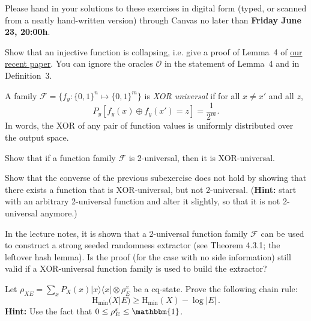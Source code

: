 \documentclass[a4paper,10pt,landscape,twocolumn]{scrartcl}
\newcommand{\ket}[1]{| #1 \rangle}
\newcommand{\bra}[1]{\langle #1 |}
\newcommand\deadline{Friday June 23, 20:00h}
\begin{document}
\newcommand{\Hmin}{\mathrm{H}_{\mathrm{min}}}

\homeworkproblems

{\sffamily\noindent
Please hand in your solutions to these exercises in digital form (typed, or scanned from a neatly hand-written version) through Canvas no later than \textbf{\deadline}.  %
}
\begin{exercise}
Show that an injective function is collapsing, i.e. give a proof of Lemma~4 of \href{https://eprint.iacr.org/2017/771.pdf}{our recent paper}. You can ignore the oracles $\mathcal{O}$ in the statement of Lemma~4 and in Definition~3.
\end{exercise}


\begin{exercise}
A family $\mathscr{F} = \{f_y : \{0,1\}^n \mapsto \{0,1\}^m\}$ is \emph{XOR universal} if for all $x \neq x'$ and all $z$,
\[
P_y[f_y(x) \oplus f_y(x') = z] = \frac{1}{2^m}.
\]
	In words, the XOR of any pair of function values is uniformly distributed over the output space.
	\begin{subex}
		Show that if a function family $\mathscr{F}$ is 2-universal, then it is XOR-universal.
	\end{subex}
    \begin{subex}
        Show that the converse of the previous subexercise does not hold by showing that there exists a function that is XOR-universal, but not 2-universal. (\textbf{Hint:} start with an arbitrary 2-universal function and alter it slightly, so that it is not 2-universal anymore.)
    \end{subex}
    \begin{subex}
    	In the lecture notes, it is shown that a 2-universal function family $\mathscr{F}$ can be used to construct a strong seeded randomness extractor (see Theorem 4.3.1; the leftover hash lemma). Is the proof (for the case with no side information) still valid if a XOR-universal function family is used to build the extractor?
    \end{subex}
\end{exercise}

\begin{exercise}
Let $\rho_{XE} = \sum_x P_X(x) \ket{x}\bra{x} \otimes \rho_E^x$ be a cq-state. Prove the following chain rule:
\[
\Hmin(X | E) \geq \Hmin(X) - \log |E| \, .
\]
\textbf{Hint: } Use the fact that $0 \leq \rho_E^x \leq \mathbbm{1}$.

\end{exercise}
\end{document}
